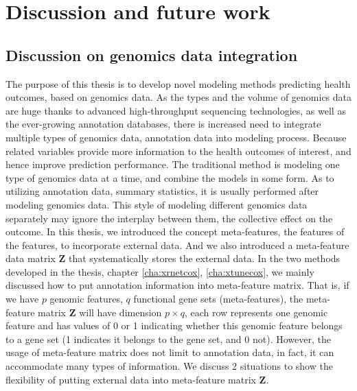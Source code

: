 \chapter{Discussion and future work}
\label{cha:conclusion}

\section{Discussion on genomics data integration}
The purpose of this thesis is to develop novel modeling methods predicting health outcomes, based on genomics data. As the types and the volume of genomics data are huge thanks to advanced high-throughput sequencing technologies, as well as the ever-growing annotation databases, there is increased need to integrate multiple types of genomics data, annotation data into modeling process. Because related variables provide more information to the health outcomes of interest, and hence improve prediction performance. The traditional method is modeling one type of genomics data at a time, and combine the models in some form. As to utilizing annotation data, summary statistics, it is usually performed after modeling genomics data. This style of modeling different genomics data separately may ignore the interplay between them, the collective effect on the outcome. In this thesis, we introduced the concept meta-features, the features of the features, to incorporate external data. And we also introduced a meta-feature data matrix $\bm{Z}$ that systematically stores the external data. In the two methods developed in the thesis, chapter \ref{cha:xrnetcox}, \ref{cha:xtunecox}, we mainly discussed how to put annotation information into meta-feature matrix. That is, if we have $p$ genomic features, $q$ functional gene sets (meta-features), the meta-feature matrix $\bm{Z}$ will have dimension $p\times q$, each row represents one genomic feature and has values of 0 or 1 indicating whether this genomic feature belongs to a gene set (1 indicates it belongs to the gene set, and 0 not). However, the usage of meta-feature matrix does not limit to annotation data, in fact, it can accommodate many types of information. We discuss 2 situations to show the flexibility of putting external data into meta-feature matrix $\bm{Z}$.

